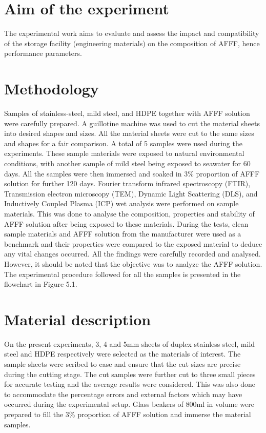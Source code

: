 \documentclass[12pt]{report}
\begin{document}
\section{Aim of the experiment}
The experimental work aims to evaluate and assess the impact and compatibility of the storage facility (engineering materials) on the composition of AFFF, hence performance parameters. 

\section{Methodology}
Samples of stainless-steel, mild steel, and HDPE together with AFFF solution were carefully prepared. A guillotine machine was used to cut the material sheets into desired shapes and sizes. All the material sheets were cut to the same sizes and shapes for a fair comparison. A total of 5 samples were used during the experiments. These sample materials were exposed to natural environmental conditions, with another sample of mild steel being exposed to seawater for 60 days. All the samples were then immersed and soaked in 3\% proportion of AFFF solution for further 120 days. Fourier transform infrared spectroscopy (FTIR), Transmission electron microscopy (TEM), Dynamic Light Scattering (DLS), and Inductively Coupled Plasma (ICP) wet analysis were performed on sample materials. This was done to analyse the composition, properties and stability of AFFF solution after being exposed to these materials. 
During the tests, clean sample materials and AFFF solution from the manufacturer were used as a benchmark and their properties were compared to the exposed material to deduce any vital changes occurred. All the findings were carefully recorded and analysed. However, it should be noted that the objective was to analyze the AFFF solution. The experimental procedure followed for all the samples is presented in the flowchart in Figure 5.1. 


\section{Material description}
On the present experiments, 3, 4 and 5mm sheets of duplex stainless steel, mild steel and HDPE respectively were selected as the materials of interest. The sample sheets were scribed to ease and ensure that the cut sizes are precise during the cutting stage. The cut samples were further cut to three small pieces for accurate testing and the average results were considered. This was also done to accommodate the percentage errors and external factors which may have occurred during the experimental setup. Glass beakers of 800ml in volume were prepared to fill the 3\% proportion of AFFF solution and immerse the material samples. 
\end{document}
